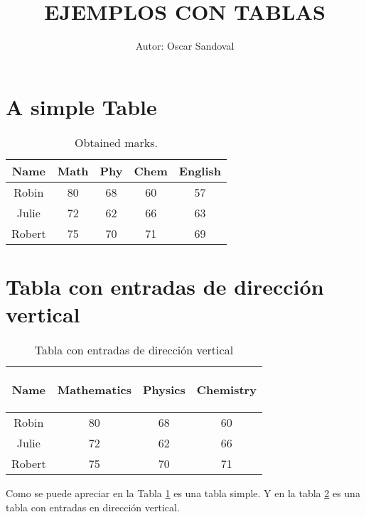 \documentclass{article}
\title{EJEMPLOS CON TABLAS}
\author{Autor: Oscar Sandoval}
\begin{document}
\maketitle
  \section{A simple Table}
    \begin{table}[!hbt]
        \centering
        \caption{Obtained marks.}
        \label{tab-marks}
        \begin{tabular}{|c|c|c|c|c|}  %
            \hline Name & Math & Phy & Chem & English\\ %
            \hline Robin & 80 & 68 & 60 & 57\\
            \hline Julie & 72 & 62 & 66 & 63\\
            \hline Robert & 75 & 70 & 71 & 69\\
            \hline
        \end{tabular}
    \end{table}

\section{Tabla con entradas de dirección vertical}
  \begin{table}[!hbt]
        \centering
        \caption{Tabla con entradas de dirección vertical}
        \label{tab-marks_vertical}
    \begin{tabular}{|c|c|c|c|}
        \hline Name& \begin{sideways}Mathematics\end{sideways}&\begin{sideways}Physics\end{sideways}&\begin{sideways}Chemistry\end{sideways}\\
        \hline Robin & 80 & 68 & 60\\
        \hline Julie & 72 & 62 & 66\\
        \hline Robert & 75 & 70 & 71\\
        \hline
    \end{tabular}
 \end{table}

Como se puede apreciar en la Tabla \ref{tab-marks} es una tabla simple. Y en la tabla \ref{tab-marks_vertical} es una tabla con entradas en dirección vertical.
\end{document}
